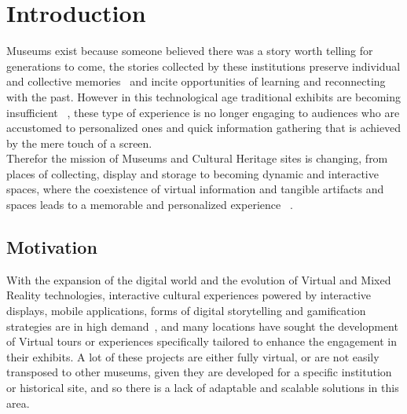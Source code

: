 
%

\chapter{Introduction}
\label{cha:introduction}


\epigraphfontsize{\small\itshape}
\setlength\epigraphwidth{12.5cm}
\setlength\epigraphrule{0pt}

Museums exist because someone believed there was a story worth telling for generations to come, the stories collected by these institutions
preserve individual and collective memories~\cite{bedford_storytelling_2001} and incite opportunities of learning and reconnecting with the past.
However in this technological age traditional exhibits are becoming insufficient ~\cite[pp. 326]{seale_education_2023}, these type of experience is no longer engaging to audiences who 
are accustomed to personalized ones and quick information gathering that is achieved by the mere touch of a screen.\\
Therefor the mission of Museums and Cultural Heritage sites is changing, from places of collecting, display and storage to becoming
dynamic and interactive spaces, where the coexistence of virtual information and tangible artifacts and spaces leads to a memorable and personalized experience ~\cite[pp. 3978]{dal_falco_museum_2017}.


\section{Motivation}
\label{sec:motivation}

With the expansion of the digital world and the evolution of Virtual and Mixed Reality technologies, interactive cultural experiences powered by
interactive displays, mobile applications, forms of digital storytelling and gamification strategies are in high demand~\cite[pp. 105]{danks_interactive_2007}, and many locations
have sought the development of Virtual tours or experiences specifically tailored to enhance the engagement in their exhibits. A lot of these projects
are either fully virtual, or are not easily transposed to other museums, given they are developed for a specific institution or historical site,
and so there is a lack of adaptable and scalable solutions in this area.

